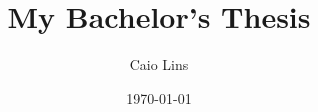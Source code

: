 \usepackage{undergraduate-thesis}
\usepackage{global-macros}

\title{My Bachelor's Thesis}
\author{Caio Lins}
\date{\today}
